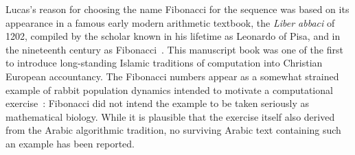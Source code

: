 Lucas's reason for choosing the name Fibonacci for the sequence was based on its appearance in a famous early modern arithmetic textbook, the \textit{Liber abbaci} of 1202, compiled by the scholar known in his lifetime as Leonardo of Pisa, and in the nineteenth century as Fibonacci~\cite{siglerFibonaccisLiberAbaci2002}. This manuscript book was one of the first to introduce long-standing Islamic traditions of computation into Christian European accountancy.  The Fibonacci numbers appear as a somewhat strained example of rabbit population dynamics intended to motivate a computational exercise~\cite{hoyrupFibonacciProtagonistWitness2014}: Fibonacci did not intend the example to be taken seriously as mathematical biology.  While it is plausible that the exercise itself also derived from the Arabic algorithmic tradition, no surviving Arabic text containing such an example has been reported.




